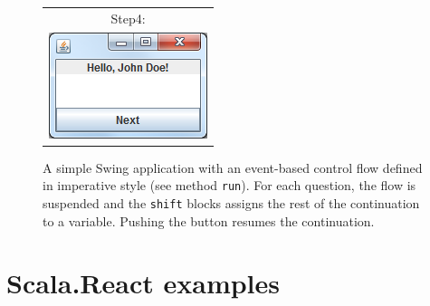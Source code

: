 \begin{figure}
\begin{minipage}{.3\linewidth}
\begin{tabular}{c}
Step4:\\
\includegraphics[width=0.9\linewidth]{images/swing-demo-step4.png} \\
\end{tabular}

    \end{minipage} 


\caption{A simple Swing application with an event-based control flow defined in imperative style (see method \texttt{run}). For each question, the flow is suspended and the \texttt{shift} blocks assigns the rest of the continuation to a variable. Pushing the button resumes the continuation.}
\label{fig:example_shift-reset-swing}
\end{figure}





\chapter{Scala.React examples}\label{chap:scala-react-examples}


